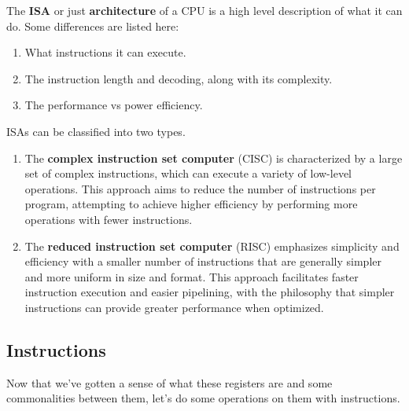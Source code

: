     \begin{definition}
      The \textbf{ISA} or just \textbf{architecture} of a CPU is a high level description of what it can do. Some differences are listed here: 
      \begin{enumerate} 
        \item What instructions it can execute. 
        \item The instruction length and decoding, along with its complexity. 
        \item The performance vs power efficiency. 
      \end{enumerate}
      ISAs can be classified into two types. 
      \begin{enumerate} 
        \item The \textbf{complex instruction set computer} (CISC) is characterized by a large set of complex instructions, which can execute a variety of low-level operations. This approach aims to reduce the number of instructions per program, attempting to achieve higher efficiency by performing more operations with fewer instructions.
        \item The \textbf{reduced instruction set computer} (RISC) emphasizes simplicity and efficiency with a smaller number of instructions that are generally simpler and more uniform in size and format. This approach facilitates faster instruction execution and easier pipelining, with the philosophy that simpler instructions can provide greater performance when optimized.
      \end{enumerate}
    \end{definition}

  \subsection{Instructions} 

      Now that we've gotten a sense of what these registers are and some commonalities between them, let's do some operations on them with instructions. 

